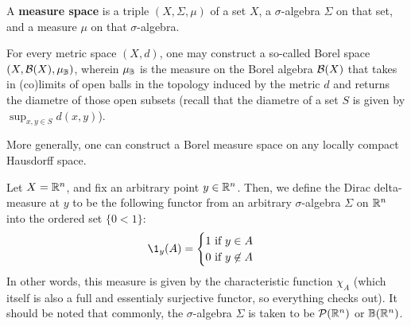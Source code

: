         \begin{definition}
            A \textbf{measure space} is a triple $(X, \Sigma, \mu)$ of a set $X$, a $\sigma$-algebra $\Sigma$ on that set, and a measure $\mu$ on that $\sigma$-algebra.
        \end{definition}
        \begin{example}
            For every metric space $(X,d)$, one may construct a so-called Borel space $(X, \mathcal{B}(X), \mu_{\mathbb{B}})$, wherein $\mu_{\mathbb{B}}$ is the measure on the Borel algebra $\mathcal{B}(X)$ that takes in (co)limits of open balls in the topology induced by the metric $d$ and returns the diametre of those open subsets (recall that the diametre of a set $S$ is given by $\sup_{x,y \in S} d(x,y)$).

            More generally, one can construct a Borel measure space on any locally compact Hausdorff space.
        \end{example}
        \begin{example}
            Let $X = \mathbb{R}^n$, and fix an arbitrary point $y \in \mathbb{R}^n$. Then, we define the Dirac delta-measure at $y$ to be the following functor from an arbitrary $\sigma$-algebra $\Sigma$ on $\mathbb{R}^n$ into the ordered set $\{0 < 1\}$:
                $$\1_y(A) = 
                    \begin{cases}
                        \text{$1$ if $y \in A$}
                        \\
                        \text{$0$ if $y \not \in A$}
                    \end{cases}
                $$
            In other words, this measure is given by the characteristic function $\chi_A$ (which itself is also a full and essentialy surjective functor, so everything checks out). It should be noted that commonly, the $\sigma$-algebra $\Sigma$ is taken to be $\mathcal{P}(\mathbb{R}^n)$ or $\mathbb{B}(\mathbb{R}^n)$.
        \end{example}
